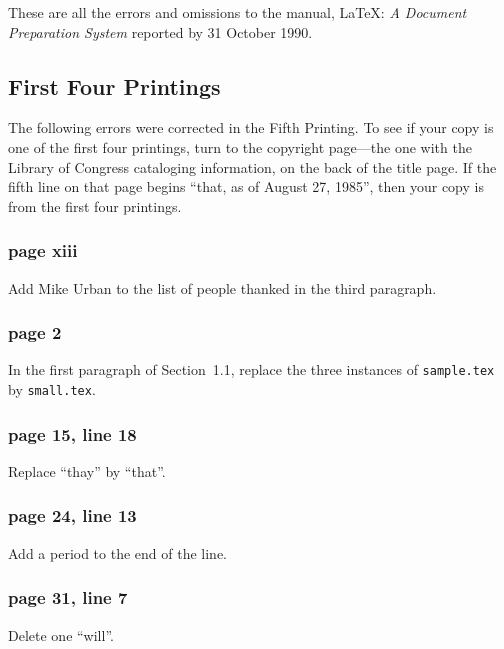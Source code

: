 
These are all the errors and omissions to the manual, \LaTeX: {\em A
Document Preparation System} reported by 31 October 1990.

\subsection{First Four Printings}

The following errors were corrected in the Fifth Printing.  To see if
your copy is one of the first four printings, turn to the copyright
page---the one with the Library of Congress cataloging information, on
the back of the title page.  If the fifth line on that page begins
``that, as of August 27, 1985'', then your copy is from the first four
printings.

\subsubsection*{page xiii}

Add Mike Urban to the list of people thanked in the third paragraph.

\subsubsection*{page 2}

In the first paragraph of Section~1.1, replace the three instances of
{\tt sample.tex} by {\tt small.tex}.

\subsubsection*{page 15, line 18}

Replace ``thay'' by ``that''.

\subsubsection*{page 24, line 13}
Add a period to the end of the line.

\subsubsection*{page 31, line 7}
Delete one ``will''.

